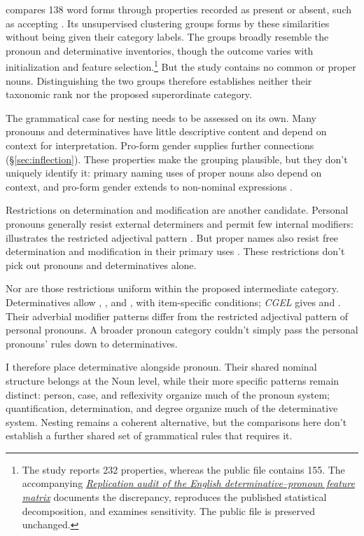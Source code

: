 \documentclass[12pt]{article}
\begin{document}
\textcite{reynolds2021} compares 138 word forms through properties recorded as present or absent, such as accepting . Its unsupervised clustering groups forms by these similarities without being given their category labels. The groups broadly resemble the pronoun and determinative inventories, though the outcome varies with initialization and feature selection.\footnote{The study reports 232 properties, whereas the public file contains 155. The accompanying \href{run:matrix-audit.pdf}{\textit{Replication audit of the English determinative--pronoun feature matrix}} documents the discrepancy, reproduces the published statistical decomposition, and examines sensitivity. The public file is preserved unchanged.} But the study contains no common or proper nouns. Distinguishing the two groups therefore establishes neither their taxonomic rank nor the proposed superordinate category.

The grammatical case for nesting needs to be assessed on its own. Many pronouns and determinatives have little descriptive content and depend on context for interpretation. Pro-form gender supplies further connections (§\ref{sec:inflection}). These properties make the grouping plausible, but they don't uniquely identify it: primary naming uses of proper nouns also depend on context, and pro-form gender extends to non-nominal expressions \citep{reynolds2025proformgender}.

Restrictions on determination and modification are another candidate. Personal pronouns generally resist external determiners and permit few internal modifiers:  illustrates the restricted adjectival pattern \citep[429--430]{huddleston2002}. But proper names also resist free determination and modification in their primary uses \citep[517, 519--520]{huddleston2002}. These restrictions don't pick out pronouns and determinatives alone.

Nor are those restrictions uniform within the proposed intermediate category. Determinatives allow , , and , with item-specific conditions; \textit{CGEL} gives  and  \citep[415--416]{huddleston2002}. Their adverbial modifier patterns differ from the restricted adjectival pattern of personal pronouns. A broader pronoun category couldn't simply pass the personal pronouns' rules down to determinatives.

I therefore place determinative alongside pronoun. Their shared nominal structure belongs at the Noun level, while their more specific patterns remain distinct: person, case, and reflexivity organize much of the pronoun system; quantification, determination, and degree organize much of the determinative system. Nesting remains a coherent alternative, but the comparisons here don't establish a further shared set of grammatical rules that requires it.
\end{document}
